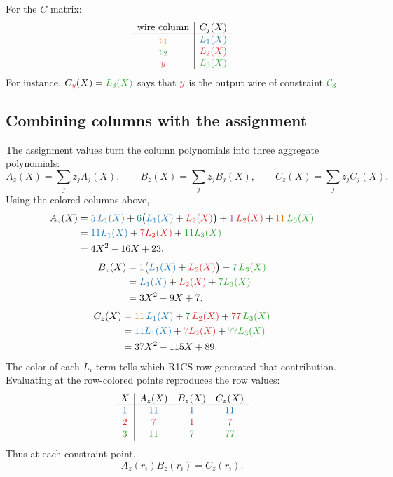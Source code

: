 For the $C$ matrix:
\[
\begin{array}{c|c}
\text{wire column} & C_j(X) \\
\hline
\vone{v_1} & \rowone{L_1(X)} \\
\vtwo{v_2} & \rowtwo{L_2(X)} \\
\ywire{y} & \rowthree{L_3(X)}
\end{array}
\]
For instance, $C_{\ywire{y}}(X)=\rowthree{L_3(X)}$ says that $\ywire{y}$ is the output wire of constraint $\rowthree{\mathcal C_3}$.

\subsection{Combining columns with the assignment}

The assignment values turn the column polynomials into three aggregate polynomials:
\[
    A_z(X)=\sum_j z_jA_j(X),
    \qquad
    B_z(X)=\sum_j z_jB_j(X),
    \qquad
    C_z(X)=\sum_j z_jC_j(X).
\]
Using the colored columns above,
\[
\begin{aligned}
A_z(X)
&=\xone{5}\,\rowone{L_1(X)}
 +\xtwo{6}\bigl(\rowone{L_1(X)}+\rowtwo{L_2(X)}\bigr)
 +\wone{1}\,\rowtwo{L_2(X)}
 +\vone{11}\,\rowthree{L_3(X)}\\
&=\rowone{11L_1(X)}+\rowtwo{7L_2(X)}+\rowthree{11L_3(X)}\\
&=4X^2-16X+23,
\end{aligned}
\]
\[
\begin{aligned}
B_z(X)
&=\constwire{1}\bigl(\rowone{L_1(X)}+\rowtwo{L_2(X)}\bigr)
 +\vtwo{7}\,\rowthree{L_3(X)}\\
&=\rowone{L_1(X)}+\rowtwo{L_2(X)}+\rowthree{7L_3(X)}\\
&=3X^2-9X+7,
\end{aligned}
\]
\[
\begin{aligned}
C_z(X)
&=\vone{11}\,\rowone{L_1(X)}+\vtwo{7}\,\rowtwo{L_2(X)}+\ywire{77}\,\rowthree{L_3(X)}\\
&=\rowone{11L_1(X)}+\rowtwo{7L_2(X)}+\rowthree{77L_3(X)}\\
&=37X^2-115X+89.
\end{aligned}
\]
The color of each $L_i$ term tells which R1CS row generated that contribution. Evaluating at the row-colored points reproduces the row values:
\[
\begin{array}{c|ccc}
X & A_z(X) & B_z(X) & C_z(X) \\
\hline
\rowone{1} & \rowone{11} & \rowone{1} & \rowone{11} \\
\rowtwo{2} & \rowtwo{7} & \rowtwo{1} & \rowtwo{7} \\
\rowthree{3} & \rowthree{11} & \rowthree{7} & \rowthree{77}
\end{array}
\]
Thus at each constraint point,
\[
    A_z(r_i)B_z(r_i)=C_z(r_i).
\]

